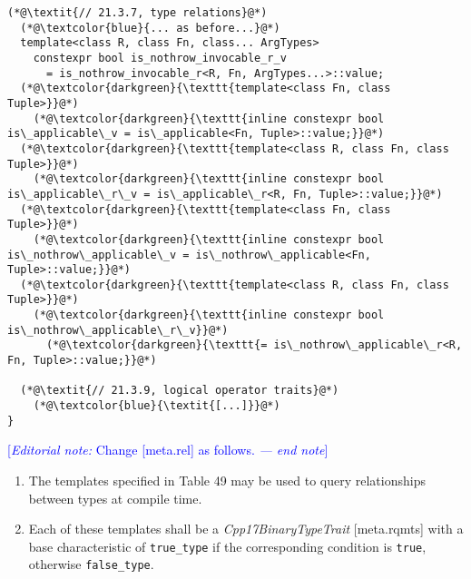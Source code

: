 \documentclass{article}
\begin{document}
\begin{lstlisting}[style=base]
  (*@\textit{// 21.3.7, type relations}@*)
  (*@\textcolor{blue}{... as before...}@*)
  template<class R, class Fn, class... ArgTypes>
    constexpr bool is_nothrow_invocable_r_v
      = is_nothrow_invocable_r<R, Fn, ArgTypes...>::value;
  (*@\textcolor{darkgreen}{\texttt{template<class Fn, class Tuple>}}@*)
    (*@\textcolor{darkgreen}{\texttt{inline constexpr bool is\_applicable\_v = is\_applicable<Fn, Tuple>::value;}}@*)
  (*@\textcolor{darkgreen}{\texttt{template<class R, class Fn, class Tuple>}}@*)
    (*@\textcolor{darkgreen}{\texttt{inline constexpr bool is\_applicable\_r\_v = is\_applicable\_r<R, Fn, Tuple>::value;}}@*)
  (*@\textcolor{darkgreen}{\texttt{template<class Fn, class Tuple>}}@*)
    (*@\textcolor{darkgreen}{\texttt{inline constexpr bool is\_nothrow\_applicable\_v = is\_nothrow\_applicable<Fn, Tuple>::value;}}@*)
  (*@\textcolor{darkgreen}{\texttt{template<class R, class Fn, class Tuple>}}@*)
    (*@\textcolor{darkgreen}{\texttt{inline constexpr bool is\_nothrow\_applicable\_r\_v}}@*)
      (*@\textcolor{darkgreen}{\texttt{= is\_nothrow\_applicable\_r<R, Fn, Tuple>::value;}}@*)

  (*@\textit{// 21.3.9, logical operator traits}@*)
    (*@\textcolor{blue}{\textit{[...]}}@*)
}
\end{lstlisting}


\textcolor{blue}{[\textit{Editorial note:} Change [meta.rel] as follows. \textit{--- end note}]}

\begin{enumerate}
\item The templates specified in Table 49 may be used to query
      relationships between types at compile time.

\item Each of these templates shall be a \textit{Cpp17BinaryTypeTrait}
      [meta.rqmts] with a base characteristic of \texttt{true\_type} if
      the corresponding condition is \texttt{true}, otherwise
      \texttt{false\_type}.

\end{enumerate}
\end{document}
